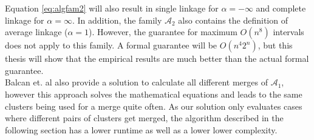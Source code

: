 Equation \ref{eq:algfam2} will also result in single linkage for $\alpha = - \infty$ and complete linkage for $\alpha = \infty$. In addition, the family $\mathcal{A}_2$ also contains the definition of average linkage ($\alpha = 1$). However, the guarantee for maximum $O(n^8)$ intervals does not apply to this family. A formal guarantee will be $O(n^4 2^n)$, but this thesis will show that the empirical results are much better than the actual formal guarantee.\\

Balcan et. al also provide a solution to calculate all different merges of $\mathcal{A}_1$, however this approach solves the mathematical equations and leads to the same clusters being used for a merge quite often. As our solution only evaluates cases where different pairs of clusters get merged, the algorithm described in the following section has a lower runtime as well as a lower lower complexity.